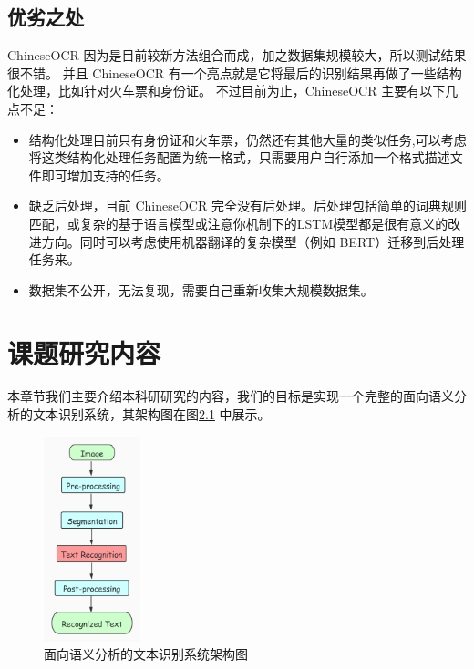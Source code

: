 \section{优劣之处}
ChineseOCR 因为是目前较新方法组合而成，加之数据集规模较大，所以测试结果很不错。
并且 ChineseOCR 有一个亮点就是它将最后的识别结果再做了一些结构化处理，比如针对火车票和身份证。
不过目前为止，ChineseOCR 主要有以下几点不足：
\begin{itemize}
	\item 结构化处理目前只有身份证和火车票，仍然还有其他大量的类似任务,可以考虑将这类结构化处理任务配置为统一格式，只需要用户自行添加一个格式描述文件即可增加支持的任务。
	\item 缺乏后处理，目前 ChineseOCR 完全没有后处理。后处理包括简单的词典规则匹配，或复杂的基于语言模型或注意你机制下的LSTM模型都是很有意义的改进方向。同时可以考虑使用机器翻译的复杂模型（例如 BERT）迁移到后处理任务来。
	\item 数据集不公开，无法复现，需要自己重新收集大规模数据集。
\end{itemize}

\chapter{课题研究内容}
本章节我们主要介绍本科研研究的内容，我们的目标是实现一个完整的面向语义分析的文本识别系统，其架构图在图\ref{system_overall} 中展示。

\begin{figure}[h!]
	\centering
	\includegraphics[width=0.25\textwidth]{figure/resources/OCR_system.jpg}
	\caption{面向语义分析的文本识别系统架构图\label{system_overall}}
\end{figure}

